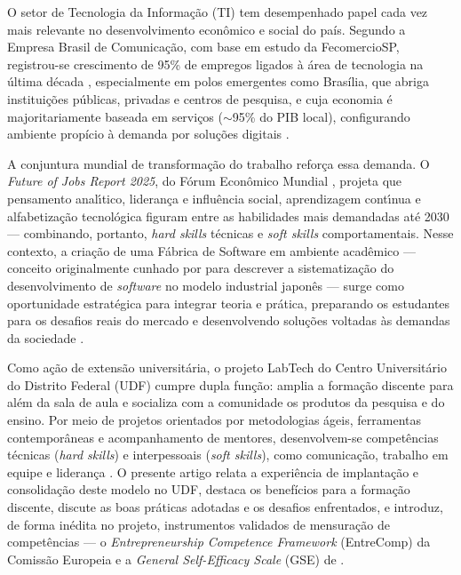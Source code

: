 \documentclass[12pt,a4paper]{article}
\begin{document}
O setor de Tecnologia da Informa\c{c}\~ao (TI) tem desempenhado papel cada
vez mais relevante no desenvolvimento econ\^omico e social do pa\'is.
Segundo a Empresa Brasil de Comunica\c{c}\~ao, com base em estudo da
FecomercioSP, registrou-se crescimento de 95\% de empregos ligados \`a
\'area de tecnologia na \'ultima d\'ecada \cite{ebctecnologia2024},
especialmente em polos emergentes como Bras\'ilia, que abriga
institui\c{c}\~oes p\'ublicas, privadas e centros de pesquisa, e cuja
economia \'e majoritariamente baseada em servi\c{c}os
($\sim$95\% do PIB local), configurando ambiente prop\'icio \`a demanda
por solu\c{c}\~oes digitais \cite{agenciapib2020}.

A conjuntura mundial de transforma\c{c}\~ao do trabalho refor\c{c}a essa
demanda. O \emph{Future of Jobs Report 2025}, do F\'orum Econ\^omico
Mundial \cite{wef:2025}, projeta que pensamento anal\'\i tico, lideran\c{c}a
e influ\^encia social, aprendizagem cont\'\i nua e alfabetiza\c{c}\~ao
tecnol\'ogica figuram entre as habilidades mais demandadas at\'e 2030 ---
combinando, portanto, \emph{hard skills} t\'ecnicas e \emph{soft skills}
comportamentais. Nesse contexto, a cria\c{c}\~ao de uma F\'abrica de
Software em ambiente acad\^emico --- conceito originalmente cunhado por
 para descrever a sistematiza\c{c}\~ao do
desenvolvimento de \emph{software} no modelo industrial japon\^es ---
surge como oportunidade estrat\'egica para integrar teoria e pr\'atica,
preparando os estudantes para os desafios reais do mercado e
desenvolvendo solu\c{c}\~oes voltadas \`as demandas da sociedade
\cite{bernardi2017learning,oliveira2017conduccao}.

Como a\c{c}\~ao de extens\~ao universit\'aria, o projeto LabTech do Centro
Universit\'ario do Distrito Federal (UDF) cumpre dupla fun\c{c}\~ao: amplia
a forma\c{c}\~ao discente para al\'em da sala de aula
\cite{santos2021experiencia} e socializa com a comunidade os produtos da
pesquisa e do ensino. Por meio de projetos orientados por metodologias
\'ageis, ferramentas contempor\^aneas e acompanhamento de mentores,
desenvolvem-se compet\^encias t\'ecnicas (\emph{hard skills}) e
interpessoais (\emph{soft skills}), como comunica\c{c}\~ao, trabalho em
equipe e lideran\c{c}a \cite{perides2021competencias}. O presente artigo
relata a experi\^encia de implanta\c{c}\~ao e consolida\c{c}\~ao deste modelo
no UDF, destaca os benef\'icios para a forma\c{c}\~ao discente, discute as
boas pr\'aticas adotadas e os desafios enfrentados, e introduz, de forma
in\'edita no projeto, instrumentos validados de mensura\c{c}\~ao de
compet\^encias --- o \emph{Entrepreneurship Competence Framework}
(EntreComp) da Comiss\~ao Europeia \cite{bacigalupo2016entrecomp} e a
\emph{General Self-Efficacy Scale} (GSE) de .
\end{document}

